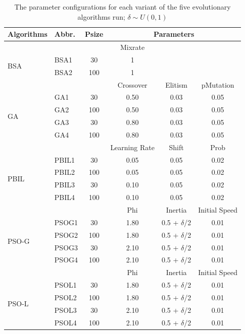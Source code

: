 \begin{table}[ht]
	\centering
	\begin{tabular}{llcccc}
		\hline
		
		Algorithms& Abbr. & Psize & \multicolumn{3}{c}{Parameters} \\ 
		\hline
		& & & Mixrate& & \\
		\multirow{2}{*}{BSA} & BSA1 & 30 & 1 && \\ 
		& BSA2 & 100 & 1&& \\ \hline
		& & & Crossover & Elitism & pMutation \\
		\multirow{4}{*}{GA}  & GA1 & 30 & 0.50 & 0.03 & 0.05 \\ 
		& GA2 & 100 & 0.50 & 0.03 & 0.05 \\ 
		& GA3 & 30 & 0.80& 0.03 & 0.05 \\ 
		& GA4 & 100 & 0.80& 0.03 & 0.05 \\ \hline 
		 &&& Learning Rate & Shift & Prob \\
		\multirow{4}{*}{PBIL} & PBIL1 & 30 & 0.05& 0.05 & 0.02 \\ 
		& PBIL2 & 100 & 0.05 & 0.05 & 0.02\\ 
		& PBIL3 & 30 & 0.10& 0.05 & 0.02 \\ 
		& PBIL4 & 100 & 0.10 & 0.05 & 0.02 \\ \hline 
		 &&& Phi & Inertia & Initial Speed \\
		\multirow{4}{*}{PSO-G} & PSOG1 & 30 & 1.80 & 0.5 + $\delta$/2 & 0.01 \\ 
		&PSOG2 & 100 & 1.80& 0.5 + $\delta$/2 & 0.01 \\ 
		&PSOG3 & 30 & 2.10 & 0.5 + $\delta$/2 & 0.01\\ 
		&PSOG4 & 100 & 2.10& 0.5 + $\delta$/2 & 0.01 \\ \hline
		 &&& Phi & Inertia & Initial Speed \\
		\multirow{4}{*}{PSO-L} & PSOL1 & 30 & 1.80& 0.5 + $\delta$/2 & 0.01 \\ 
		& PSOL2 & 100 & 1.80& 0.5 + $\delta$/2 & 0.01 \\ 
		& PSOL3 & 30 & 2.10 & 0.5 + $\delta$/2 & 0.01\\ 
		& PSOL4 & 100 & 2.10 & 0.5 + $\delta$/2 & 0.01 \\ 
		\hline
	\end{tabular}
\caption{The parameter configurations for each variant of the five evolutionary algorithms run; $\delta \sim U(0,1)$}
\label{tbl:params}
\end{table}



